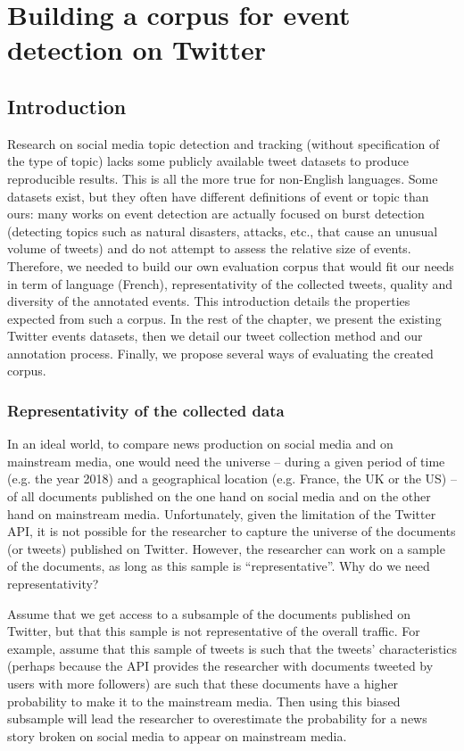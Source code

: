 \chapter{Building a corpus for event detection on Twitter}
\label{Chapter: Corpus}

\section{Introduction}

Research on social media topic detection and tracking (without specification
of the type of topic) lacks some publicly available tweet
datasets to produce reproducible results. This is all the
more true for non-English languages. Some datasets exist, but they often have different definitions of event or topic than ours: many works on event detection are actually focused on  burst detection (detecting topics such as natural disasters, attacks, etc., that cause an unusual volume of tweets) and do not attempt to assess the relative size of events. 
Therefore, we needed to build our own evaluation corpus that would fit our needs in term of language (French), representativity of the collected tweets, quality and diversity of the annotated events. This introduction details the properties expected from such a corpus. In the rest of the chapter, we present the existing Twitter events datasets, then we detail our tweet collection method and our annotation process. Finally, we propose several ways of evaluating the created corpus.

\subsection{Representativity of the collected data}
In an ideal world, to compare news production on social media and on mainstream media, one would need the universe – during a given period of time (e.g. the year 2018) and a geographical location (e.g. France, the UK or the US) – of all documents published on the one hand on social media and on the other hand on mainstream media. Unfortunately, given the limitation of the Twitter API, it is not possible for the researcher to capture the universe of the documents (or tweets) published on Twitter. However, the researcher can work on a sample of the documents, as long as this sample is ``representative”. Why do we need representativity?


Assume that we get access to a subsample of the documents published on Twitter, but that this sample is not representative of the overall traffic. For example, assume that this sample of tweets is such that the tweets’ characteristics (perhaps because the API provides the researcher with documents tweeted by users with more followers) are such that these documents have a higher probability to make it to the mainstream media. Then using this biased subsample will lead the researcher to overestimate the probability for a news story broken on social media to appear on mainstream media.


